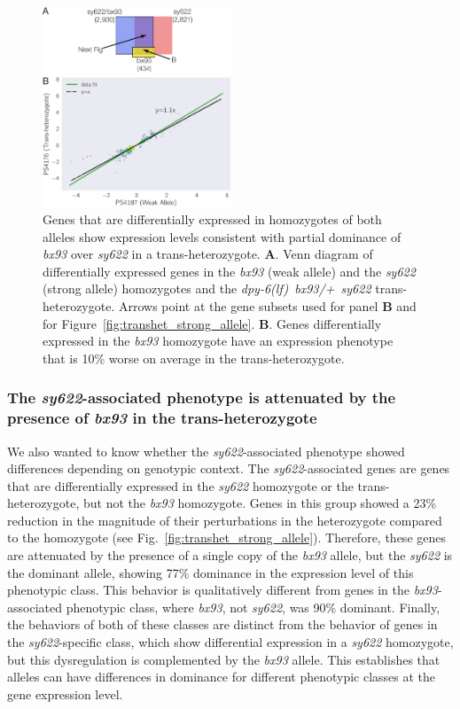 \documentclass[10pt, onecolumn]{article}
\newcommand{\genotype}[1]{\mbox{\emph{#1}}}
\begin{document}
\begin{figure}
  \centering{}
  \includegraphics[width=0.5\textwidth]{../figs/transhet_weak_allele.pdf}
  \caption{
  Genes that are differentially expressed in homozygotes of both alleles show
  expression levels consistent with partial dominance of \emph{bx93} over
  \emph{sy622} in a trans-heterozygote.
  \textbf{A}. Venn diagram of differentially expressed genes in the \emph{bx93}
  (weak allele) and the \emph{sy622} (strong allele) homozygotes and the
  \genotype{dpy-6(lf) bx93/+ sy622} trans-heterozygote. Arrows point at the
  gene subsets used for panel \textbf{B} and for
  Figure~\ref{fig:transhet_strong_allele}.
  \textbf{B}. Genes differentially expressed in the \emph{bx93} homozygote have
  an expression phenotype that is 10\% worse on average in the
  trans-heterozygote.
  }
\label{fig:transhet_weak_allele}
\end{figure}

\subsubsection*{The \emph{sy622}-associated phenotype is attenuated by the presence
            of \emph{bx93} in the trans-heterozygote}
We also wanted to know whether the \emph{sy622}-associated phenotype showed
differences depending on genotypic context. The \emph{sy622}-associated genes
are genes that are differentially expressed in the \emph{sy622} homozygote or
the trans-heterozygote, but not the \emph{bx93} homozygote. Genes in this group
showed a 23\% reduction in the magnitude of their perturbations in the
heterozygote compared to the homozygote (see
Fig.~\ref{fig:transhet_strong_allele}). Therefore, these genes are attenuated by
the presence of a single copy of the \emph{bx93} allele, but the \emph{sy622} is
the dominant allele, showing 77\% dominance in the expression level of this
phenotypic class. This behavior is qualitatively different from genes in the
\emph{bx93}-associated phenotypic class, where \emph{bx93}, not \emph{sy622},
was 90\% dominant. Finally, the behaviors of both of these classes are distinct
from the behavior of genes in the \emph{sy622}-specific class, which show
differential expression in a \emph{sy622} homozygote, but this dysregulation is
complemented by the \emph{bx93} allele. This establishes that alleles can have
differences in dominance for different phenotypic classes at the gene expression
level.
\end{document}
